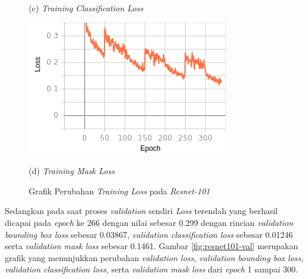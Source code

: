 \begin{figure}[H]
\begin{minipage}{0.45\textwidth}
		\caption*{(c) \textit{Training Classification Loss}}
	\end{minipage}
	\hfill
	\begin{minipage}{0.45\textwidth}
		\includegraphics[width=\textwidth]{gambar/training_resnet50/tugas-akhir-Page-15 (3).png}
		\caption*{(d) \textit{Training Mask Loss}}
	\end{minipage}
	\caption{Grafik Perubahan \textit{Training Loss} pada \textit{Resnet-101}}
	\label{fig:resnet101-training}
\end{figure}

Sedangkan pada saat proses \textit{validation} sendiri \textit{Loss} terendah yang berhasil dicapai pada \textit{epoch} ke 266 dengan nilai sebesar 0.299 dengan rincian \textit{validation bounding box loss} sebesar 0.03867, \textit{validation classification loss} sebesar 0.01246 serta \textit{validation mask loss} sebesar 0.1461. Gambar \ref{fig:resnet101-val} merupakan grafik yang menunjukkan perubahan \textit{validation loss, validation bounding box loss, validation classification loss,} serta \textit{validation mask loss} dari \textit{epoch} 1 sampai 300.

\newpage

